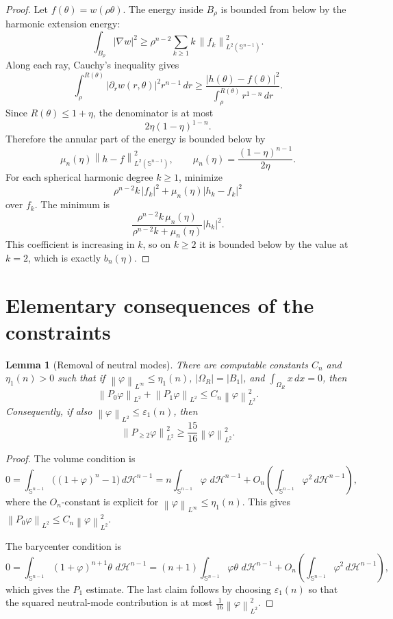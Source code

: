 \documentclass[11pt]{article}
\newtheorem{lemma}[theorem]{Lemma}
\newcommand{\Sph}{\mathbb S^{n-1}}
\newcommand{\Om}{\Omega}
\newcommand{\eps}{\varepsilon}
\newcommand{\dH}{\,d\mathcal H^{n-1}}
\newcommand{\norm}[1]{\left\|#1\right\|}
\begin{document}
\begin{proof}
Let \(f(\theta)=w(\rho\theta)\).  The energy inside \(B_\rho\) is bounded
from below by the harmonic extension energy:
\[
   \int_{B_\rho}|\nabla w|^2
      \ge \rho^{n-2}\sum_{k\ge1} k\,\norm{f_k}_{L^2(\Sph)}^2 .
\]
Along each ray, Cauchy's inequality gives
\[
   \int_{\rho}^{R(\theta)} |\partial_r w(r,\theta)|^2 r^{n-1}\,dr
      \ge
   \frac{|h(\theta)-f(\theta)|^2}
        {\int_\rho^{R(\theta)}r^{1-n}\,dr}.
\]
Since \(R(\theta)\le1+\eta\), the denominator is at most
\[
   2\eta(1-\eta)^{1-n}.
\]
Therefore the annular part of the energy is bounded below by
\[
   \mu_n(\eta)\norm{h-f}_{L^2(\Sph)}^2,
   \qquad \mu_n(\eta)=\frac{(1-\eta)^{n-1}}{2\eta}.
\]
For each spherical harmonic degree \(k\ge1\), minimize
\[
   \rho^{n-2}k\,|f_k|^2+\mu_n(\eta)|h_k-f_k|^2
\]
over \(f_k\).  The minimum is
\[
   \frac{\rho^{n-2}k\,\mu_n(\eta)}
        {\rho^{n-2}k+\mu_n(\eta)}
   |h_k|^2 .
\]
This coefficient is increasing in \(k\), so on \(k\ge2\) it is bounded
below by the value at \(k=2\), which is exactly \(b_n(\eta)\).
\end{proof}

\section{Elementary consequences of the constraints}

\begin{lemma}[Removal of neutral modes]\label{lem:modes}
There are computable constants \(C_n\) and \(\eta_1(n)>0\) such that if
\(\norm{\varphi}_{L^\infty}\le\eta_1(n)\), \(|\Om_R|=|B_1|\), and
\(\int_{\Om_R}x\,dx=0\), then
\[
   \norm{P_0\varphi}_{L^2}+\norm{P_1\varphi}_{L^2}
      \le C_n\norm{\varphi}_{L^2}^2 .
\]
Consequently, if also \(\norm{\varphi}_{L^2}\le\eps_1(n)\), then
\[
   \norm{P_{\ge2}\varphi}_{L^2}^2
      \ge \frac{15}{16}\norm{\varphi}_{L^2}^2 .
\]
\end{lemma}

\begin{proof}
The volume condition is
\[
   0=\int_{\Sph}\bigl((1+\varphi)^n-1\bigr)\dH
     =n\int_{\Sph}\varphi\,\dH
       +O_n\!\left(\int_{\Sph}\varphi^2\dH\right),
\]
where the \(O_n\)-constant is explicit for
\(\norm{\varphi}_{L^\infty}\le\eta_1(n)\).  This gives
\(\norm{P_0\varphi}_{L^2}\le C_n\norm{\varphi}_{L^2}^2\).

The barycenter condition is
\[
   0=\int_{\Sph}(1+\varphi)^{n+1}\theta\,\dH
     =(n+1)\int_{\Sph}\varphi\theta\,\dH
       +O_n\!\left(\int_{\Sph}\varphi^2\dH\right),
\]
which gives the \(P_1\) estimate.  The last claim follows by choosing
\(\eps_1(n)\) so that the squared neutral-mode contribution is at most
\(\frac1{16}\norm{\varphi}_{L^2}^2\).
\end{proof}
\end{document}

